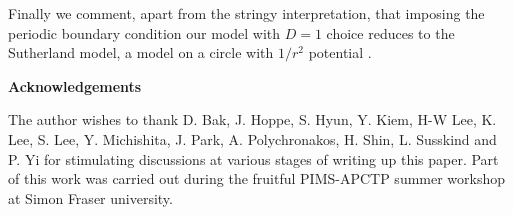 \documentclass[a4paper,12pt]{article}
\begin{document}
Finally we comment, apart from the stringy interpretation, that imposing the periodic boundary condition our model
with  $D=1$ choice reduces to the Sutherland model, a  model on a circle with $1/r^{2}$ potential
\cite{Sutherland,PLB26629}.
\newline
\newline
\newline
\begin{center}
\large{\textbf{Acknowledgements}}
\end{center}
The author  wishes to thank D. Bak, J. Hoppe, S. Hyun,  Y. Kiem, H-W Lee, K. Lee,  S. Lee, Y. Michishita, J. Park, A. Polychronakos, 
H. Shin, L. Susskind and P. Yi for stimulating discussions at various stages of writing up this paper.  Part of
this work was carried out during the fruitful PIMS-APCTP summer workshop  at Simon Fraser university.
\newline
\newline
\newpage
\end{document}
